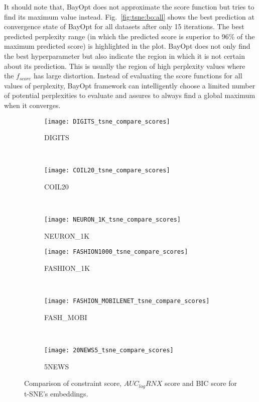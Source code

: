 It should note that, BayOpt does not approximate the score function but tries to find its maximum value instead.
Fig.~\ref{fig:tsne:bo:all} shows the best prediction at convergence state of BayOpt for all datasets after only 15 iterations.
The best predicted perplexity range (in which the predicted score is superior to 96\% of the maximum predicted score) is highlighted in the plot.
BayOpt does not only find the best hyperparameter but also indicate the region in which it is not certain about its prediction.
This is usually the region of high perplexity values where the $f_{score}$ has large distortion.
Instead of evaluating the score functions for all values of perplexity, BayOpt framework can intelligently choose a limited number of potential perplexities to evaluate and assures to always find a global maximum when it converges.

\begin{figure}%
    \centering
    \begin{subfigure}[b]{0.3\linewidth}
        \centering
        \texttt{[image: DIGITS\_tsne\_compare\_scores]}
        \caption{DIGITS}
    \end{subfigure}
    ~
    \begin{subfigure}[b]{0.3\linewidth}
        \texttt{[image: COIL20\_tsne\_compare\_scores]}
        \caption{COIL20}
    \end{subfigure}
    ~
    \begin{subfigure}[b]{0.3\linewidth}
        \texttt{[image: NEURON\_1K\_tsne\_compare\_scores]}
        \caption{NEURON\_1K}
    \end{subfigure}
    \vfill
    \begin{subfigure}[b]{0.3\linewidth}
        \centering
        \texttt{[image: FASHION1000\_tsne\_compare\_scores]}
        \caption{FASHION\_1K}
    \end{subfigure}
    ~
    \begin{subfigure}[b]{0.3\linewidth}
        \texttt{[image: FASHION\_MOBILENET\_tsne\_compare\_scores]}
        \caption{FASH\_MOBI}
    \end{subfigure}
    ~
    \begin{subfigure}[b]{0.3\linewidth}
        \texttt{[image: 20NEWS5\_tsne\_compare\_scores]}
        \caption{5NEWS}
    \end{subfigure}
    \caption{Comparison of constraint score, $AUC_{log}RNX$ score and BIC score for t-SNE's embeddings.}
    \label{fig:tsne:compare}
\end{figure}

